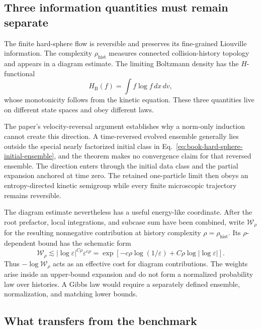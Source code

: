 \subsection{Three information quantities must remain separate}

The finite hard-sphere flow is reversible and preserves its fine-grained Liouville information.
The complexity $\rho_{\mathrm{hist}}$ measures connected collision-history topology and appears in
a diagram estimate.  The limiting Boltzmann density has the $H$-functional
\begin{equation}
H_{\mathrm B}(f)=\int f\log f\,dx\,dv,
\label{eq:book-boltzmann-h-functional}
\end{equation}
whose monotonicity follows from the kinetic equation.  These three quantities live on different
state spaces and obey different laws.

The paper's velocity-reversal argument establishes why a norm-only induction cannot create this
direction.  A time-reversed evolved ensemble generally lies outside the special nearly factorized
initial class in Eq.~\ref{eq:book-hard-sphere-initial-ensemble}, and the theorem makes no convergence
claim for that reversed ensemble.  The direction enters through the initial data class and the
partial expansion anchored at time zero.  The retained one-particle limit then obeys an
entropy-directed kinetic semigroup while every finite microscopic trajectory remains reversible.

The diagram estimate nevertheless has a useful energy-like coordinate.  After the root prefactor,
local integrations, and subcase sum have been combined, write $\mathcal W_\rho$ for the resulting
nonnegative contribution at history complexity $\rho=\rho_{\mathrm{hist}}$.  Its
$\rho$-dependent bound has the schematic form
\begin{equation}
\mathcal W_\rho
\lesssim |\log\varepsilon|^{C\rho}\varepsilon^{c\rho}
=\exp\!\left[-c\rho\log(1/\varepsilon)
              +C\rho\log|\log\varepsilon|\right].
\label{eq:book-history-effective-action}
\end{equation}
Thus $-\log\mathcal W_\rho$ acts as an effective cost for diagram contributions.  The weights arise
inside an upper-bound expansion and do not form a normalized probability law over histories.  A
Gibbs law would require a separately defined ensemble, normalization, and matching lower bounds.

\subsection{What transfers from the benchmark}


